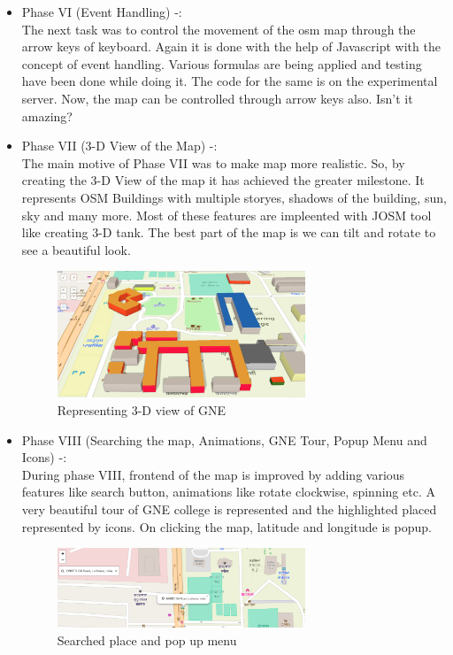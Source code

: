 \begin{itemize}
\item Phase VI (Event Handling) -: \\
The next task was to control the movement of the osm map through the arrow keys of keyboard. Again it is done with the help of Javascript with the concept of event handling. Various formulas are being applied and testing have been done while doing it. The code for the same is on the experimental server. Now, the map can be controlled through arrow keys also. Isn't it amazing?

\item Phase VII (3-D View of the Map) -: \\
The main motive of Phase VII was to make map more realistic. So, by creating the 3-D View of the map it has achieved the greater milestone. It represents OSM Buildings with multiple storyes, shadows of the building, sun, sky and many more. Most of these features are impleented with JOSM tool like creating 3-D tank. The best part of the map is we can tilt and rotate to see a beautiful look.

\begin{figure}[h!]
\centering \includegraphics[width=0.7\textwidth]{input/images/osm_building.png}
\caption{Representing 3-D view of GNE}
\end{figure}

\item Phase VIII (Searching the map, Animations, GNE Tour, Popup Menu and Icons) -: \\
	During phase VIII, frontend of the map is improved by adding various features like search button, animations like rotate clockwise, spinning etc. A very beautiful tour of GNE college is represented and the highlighted placed represented by icons. On clicking the map, latitude and longitude is popup.
	\begin{figure}[h!]
		\centering \includegraphics[width=0.7\textwidth]{input/images/osm_search.png}
		\caption{Searched place and pop up menu}
	\end{figure}


\end{itemize}
